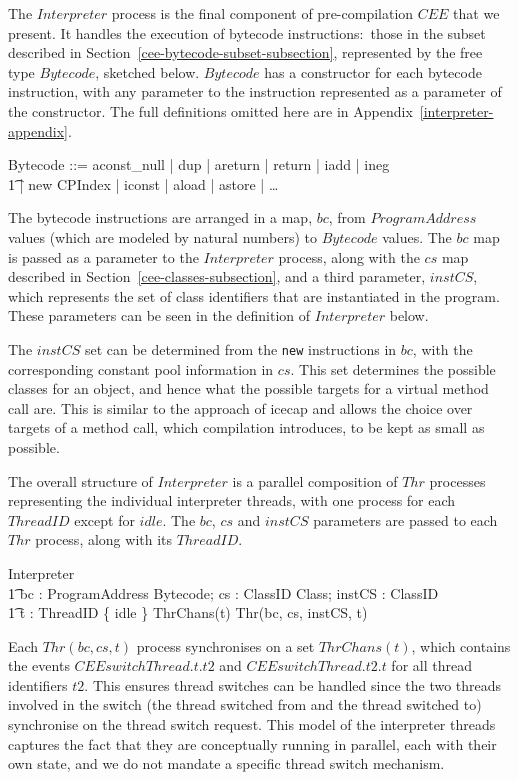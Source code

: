 The $Interpreter$ process is the final component of pre-compilation
$CEE$ that we present. 
It handles the execution of bytecode instructions:~those in the subset
described in Section~\ref{cee-bytecode-subset-subsection}, represented
by the free type $Bytecode$, sketched below.
$Bytecode$ has a constructor for each bytecode instruction, with any
parameter to the instruction represented as a parameter of the
constructor.
The full definitions omitted here are in
Appendix~\ref{interpreter-appendix}.
\begin{zed}
  Bytecode ::= aconst\_null | dup | areturn | return | iadd | ineg \\
  \t1 | new \ldata CPIndex \rdata | iconst \ldata \nat \rdata | aload \ldata \nat \rdata | astore \ldata \nat \rdata | \dots
\end{zed}
The bytecode instructions are arranged in a map, $bc$, from
$ProgramAddress$ values (which are modeled by natural numbers) to
$Bytecode$ values.
The $bc$ map is passed as a parameter to the $Interpreter$ process,
along with the $cs$ map described in
Section~\ref{cee-classes-subsection}, and a third parameter, $instCS$,
which represents the set of class identifiers that are instantiated in
the program.
These parameters can be seen in the definition of $Interpreter$ below.

The $instCS$ set can be determined from the \texttt{new} instructions
in $bc$, with the corresponding constant pool information in $cs$.
This set determines the possible classes for an object, and hence what
the possible targets for a virtual method call are.
This is similar to the approach of icecap and allows the choice over
targets of a method call, which compilation introduces, to be kept as
small as possible.

The overall structure of $Interpreter$ is a parallel composition of
$Thr$ processes representing the individual interpreter threads, with
one process for each $ThreadID$ except for $idle$.
The $bc$, $cs$ and $instCS$ parameters are passed to each $Thr$
process, along with its $ThreadID$.
\begin{circus}
  \circprocess Interpreter \circdef \\
  \t1 bc : ProgramAddress \pfun Bytecode; cs : ClassID \pfun Class; instCS : \finset ClassID \circspot \\
  \t1 \Parallel t : ThreadID \setminus \{ idle \} \lpar ThrChans(t) \rpar \circspot Thr(bc, cs, instCS, t)
\end{circus}
Each $Thr(bc,cs,t)$ process synchronises on a set $ThrChans(t)$, which
contains the events $CEEswitchThread.t.t2$ and $CEEswitchThread.t2.t$
for all thread identifiers $t2$.
This ensures thread switches can be handled since the two threads
involved in the switch (the thread switched from and the thread
switched to) synchronise on the thread switch request.
This model of the interpreter threads captures the fact that they are
conceptually running in parallel, each with their own state, and we do
not mandate a specific thread switch mechanism.

